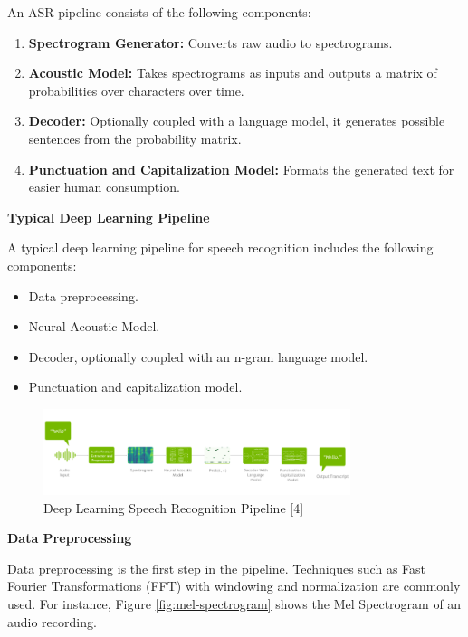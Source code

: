 An ASR pipeline consists of the following components:


\begin{enumerate}
    \item \textbf{Spectrogram Generator:} Converts raw audio to spectrograms.
    \item \textbf{Acoustic Model:} Takes spectrograms as inputs and outputs a matrix of probabilities over characters over time.
    \item \textbf{Decoder:} Optionally coupled with a language model, it generates possible sentences from the probability matrix.
    \item \textbf{Punctuation and Capitalization Model:} Formats the generated text for easier human consumption.
\end{enumerate}

\textbf{Typical Deep Learning Pipeline}

A typical deep learning pipeline for speech recognition includes the following components:

\begin{itemize}
    \item Data preprocessing.
    \item Neural Acoustic Model.
    \item Decoder, optionally coupled with an n-gram language model.
    \item Punctuation and capitalization model.
\end{itemize}

\begin{figure}[ht]
    \centering
    \includegraphics[width=0.8\textwidth]{Figure2.1.png}
    \caption{Deep Learning Speech Recognition Pipeline [4]}
    \label{fig:pipeline}
\end{figure}

\textbf{Data Preprocessing}

Data preprocessing is the first step in the pipeline. Techniques such as Fast Fourier Transformations (FFT) with windowing and normalization are commonly used. For instance, Figure \ref{fig:mel-spectrogram} shows the Mel Spectrogram of an audio recording.

